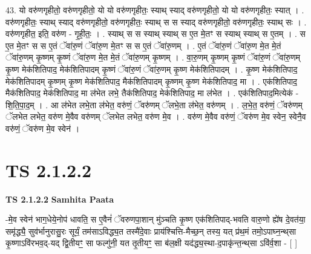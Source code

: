 \documentclass[17pt]{extarticle}
\begin{document}
43. यो वरु॑णगृहीतो॒ वरु॑णगृहीतो॒ यो यो वरु॑णगृहीतः॒ स्याथ् स्याद् वरु॑णगृहीतो॒ यो यो वरु॑णगृहीतः॒ स्यात् । . वरु॑णगृहीतः॒ स्याथ् स्याद् वरु॑णगृहीतो॒ वरु॑णगृहीतः॒ स्याथ् स स स्याद् वरु॑णगृहीतो॒ वरु॑णगृहीतः॒ स्याथ् सः । . वरु॑णगृहीत॒ इति॒ वरु॑ण - गृ॒ही॒तः॒ । . स्याथ् स स स्याथ् स्याथ् स ए॒त मे॒तꣳ स स्याथ् स्याथ् स ए॒तम् । . स ए॒त मे॒तꣳ स स ए॒तं ॅवा॑रु॒णं ॅवा॑रु॒ण मे॒तꣳ स स ए॒तं ॅवा॑रु॒णम् । . ए॒तं ॅवा॑रु॒णं ॅवा॑रु॒ण मे॒त मे॒तं ॅवा॑रु॒णम् कृ॒ष्णम् कृ॒ष्णं ॅवा॑रु॒ण मे॒त मे॒तं ॅवा॑रु॒णम् कृ॒ष्णम् । . वा॒रु॒णम् कृ॒ष्णम् कृ॒ष्णं ॅवा॑रु॒णं ॅवा॑रु॒णम् कृ॒ष्ण मेक॑शितिपाद॒ मेक॑शितिपादम् कृ॒ष्णं ॅवा॑रु॒णं ॅवा॑रु॒णम् कृ॒ष्ण मेक॑शितिपादम् । . कृ॒ष्ण मेक॑शितिपाद॒ मेक॑शितिपादम् कृ॒ष्णम् कृ॒ष्ण मेक॑शितिपाद॒ मैक॑शितिपादम् कृ॒ष्णम् कृ॒ष्ण मेक॑शितिपाद॒ मा । . एक॑शितिपाद॒ मैक॑शितिपाद॒ मेक॑शितिपाद॒ मा ल॑भेत लभे॒ तैक॑शितिपाद॒ मेक॑शितिपाद॒ मा ल॑भेत । . एक॑शितिपाद॒मित्येक॑ - शि॒ति॒पा॒द॒म् । . आ ल॑भेत लभे॒ता ल॑भेत॒ वरु॑णं॒ ॅवरु॑णम् ॅलभे॒ता ल॑भेत॒ वरु॑णम् । . ल॒भे॒त॒ वरु॑णं॒ ॅवरु॑णम् ॅलभेत लभेत॒ वरु॑ण मे॒वैव वरु॑णम् ॅलभेत लभेत॒ वरु॑ण मे॒व । . वरु॑ण मे॒वैव वरु॑णं॒ ॅवरु॑ण मे॒व स्वेन॒ स्वेनै॒व वरु॑णं॒ ॅवरु॑ण मे॒व स्वेन॑ । \newline
\pagebreak
{}

\section{ TS 2.1.2.2 }

\textbf{TS 2.1.2.2 } \newline
\textbf{Samhita Paata} \newline

-मे॒व स्वेन॑ भाग॒धेये॒नोप॑ धावति॒ स ए॒वैनं॑ ॅवरुणपा॒शान् मु॑ञ्चति कृ॒ष्ण एक॑शितिपाद्-भवति वारु॒णो ह्ये॑ष दे॒वत॑या॒ समृ॑द्ध्यै॒ सुव॑र्भानुरासु॒रः सूर्यं॒ तम॑साऽविद्ध्य॒त तस्मै॑दे॒वाः प्राय॑श्चित्ति-मैच्छ॒न् तस्य॒ यत् प्र॑थ॒मं तमो॒ऽपाघ्न॒न्थ्‌सा कृ॒ष्णाऽवि॑रभव॒द्-यद् द्वि॒तीयꣳ॒॒ सा फल्गु॑नी॒ यत तृ॒तीयꣳ॒॒ सा ब॑ल॒क्षी यद॑द्ध्य॒स्था-द॒पाकृ॑न्त॒न्थ्‌सा ऽवि॑र्व॒शा - [  ] \newline
\end{document}
